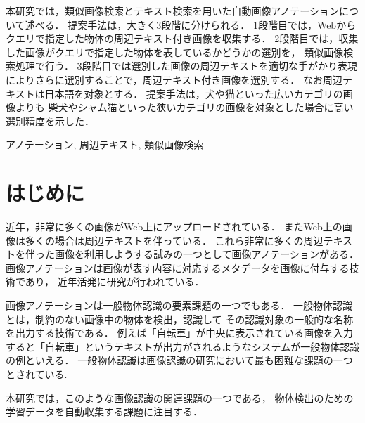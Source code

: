 \documentclass{deimj}
\begin{document}
\pagestyle{empty}
\begin{jabstract}
本研究では，類似画像検索とテキスト検索を用いた自動画像アノテーションについて述べる．
提案手法は，大きく3段階に分けられる．
1段階目では，Webからクエリで指定した物体の周辺テキスト付き画像を収集する．
2段階目では，収集した画像がクエリで指定した物体を表しているかどうかの選別を，
類似画像検索処理で行う．
3段階目では選別した画像の周辺テキストを適切な手がかり表現によりさらに選別することで，周辺テキスト付き画像を選別する．
なお周辺テキストは日本語を対象とする．
提案手法は，犬や猫といった広いカテゴリの画像よりも
柴犬やシャム猫といった狭いカテゴリの画像を対象とした場合に高い選別精度を示した．

\end{jabstract}
\begin{jkeyword}
アノテーション, 周辺テキスト, 類似画像検索
\end{jkeyword}
\maketitle

\section{はじめに}
\label{sec:intro}
近年，非常に多くの画像がWeb上にアップロードされている．
またWeb上の画像は多くの場合は周辺テキストを伴っている．
これら非常に多くの周辺テキストを伴った画像を利用しようする試みの一つとして画像アノテーションがある．
画像アノテーションは画像が表す内容に対応するメタデータを画像に付与する技術であり，
近年活発に研究が行われている\cite{jeon,watanabe}．

画像アノテーションは一般物体認識の要素課題の一つでもある．
一般物体認識とは，制約のない画像中の物体を検出，認識して
その認識対象の一般的な名称を出力する技術である．
例えば「自転車」が中央に表示されている画像を入力すると「自転車」というテキストが出力がされるようなシステムが一般物体認識の例といえる．
一般物体認識は画像認識の研究において最も困難な課題の一つとされている\cite{yanai}.

%
本研究では，このような画像認識の関連課題の一つである，
物体検出のための学習データを自動収集する課題に注目する．
\end{document}
